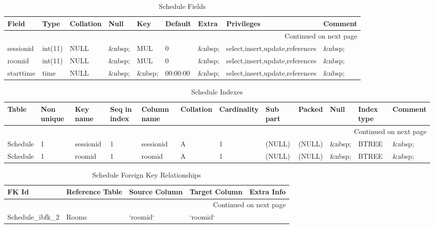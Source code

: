 \documentclass[tablesignature]{scrartcl}
\begin{document}
\begin{longtable}{|l|l|l|l|l|l|l|l|l|}
\caption{Schedule Fields} \label{tbl:schedulefields}\\
\hline
 Field       &  Type     &  Collation  &  Null     &  Key      &   Default  &  Extra              &  Privileges                       &  Comment \\
\hline
\endhead
\hline\multicolumn{9}{r}{Continued on next page}\
\endfoot
\endlastfoot
\hline
 scheduleid  &  int(11)  &  NULL       &  \&nbsp;  &  PRI      &    (NULL)  &  auto\_{}increment  &  select,insert,update,references  &  \&nbsp;  \\
 sessionid   &  int(11)  &  NULL       &  \&nbsp;  &  MUL      &         0  &  \&nbsp;            &  select,insert,update,references  &  \&nbsp;  \\
 roomid      &  int(11)  &  NULL       &  \&nbsp;  &  MUL      &         0  &  \&nbsp;            &  select,insert,update,references  &  \&nbsp;  \\
 starttime   &  time     &  NULL       &  \&nbsp;  &  \&nbsp;  &  00:00:00  &  \&nbsp;            &  select,insert,update,references  &  \&nbsp;  \\
\hline
\end{longtable}


\begin{longtable}{|l|l|l|l|l|l|l|l|l|l|l|l|}
\caption{Schedule Indexes} \label{tbl:scheduleindexes}\\
\hline
 Table     &  Non unique  &  Key name   &  Seq in index  &  Column name  &  Collation  &  Cardinality  &  Sub part  &  Packed  &  Null     &  Index type  &  Comment \\
\hline
\endhead
\hline\multicolumn{12}{r}{Continued on next page}\
\endfoot
\endlastfoot
\hline
 Schedule  &           0  &  PRIMARY    &             1  &  scheduleid   &  A          &            1  &  (NULL)    &  (NULL)  &  \&nbsp;  &  BTREE       &  \&nbsp;  \\
 Schedule  &           1  &  sessionid  &             1  &  sessionid    &  A          &            1  &  (NULL)    &  (NULL)  &  \&nbsp;  &  BTREE       &  \&nbsp;  \\
 Schedule  &           1  &  roomid     &             1  &  roomid       &  A          &            1  &  (NULL)    &  (NULL)  &  \&nbsp;  &  BTREE       &  \&nbsp;  \\
\hline
\end{longtable}


\begin{longtable}{|l|l|l|l|l|}
\caption{Schedule Foreign Key Relationships} \label{tbl:schedulefkr}\\
\hline
 FK Id                  &  Reference Table  &  Source Column  &  Target Column  &  Extra Info \\
\hline
\endhead
\hline\multicolumn{5}{r}{Continued on next page}\
\endfoot
\endlastfoot
\hline
 Schedule\_{}ibfk\_{}1  &  Sessions         &  `sessionid`    &  `sessionid`    &              \\
 Schedule\_{}ibfk\_{}2  &  Rooms            &  `roomid`       &  `roomid`       &              \\
\hline
\end{longtable}
\end{document}

